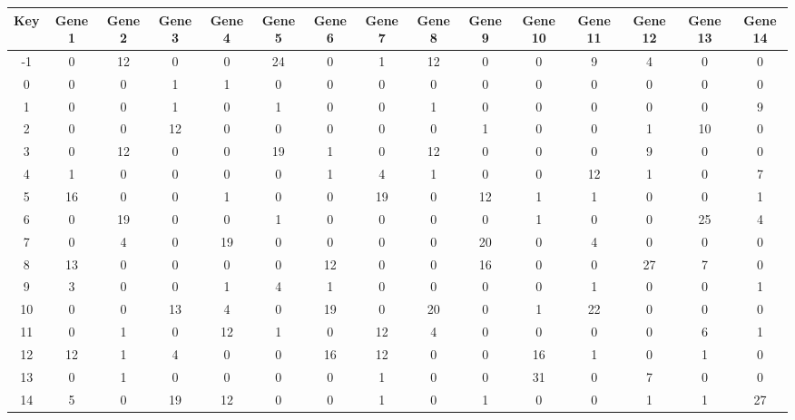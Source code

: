 \begin{tabular}{|c|c|c|c|c|c|c|c|c|c|c|c|c|c|c|}
\hline
Key & Gene 1 & Gene 2 & Gene 3 & Gene 4 & Gene 5 & Gene 6 & Gene 7 & Gene 8 & Gene 9 & Gene 10 & Gene 11 & Gene 12 & Gene 13 & Gene 14 \\
\hline
-1 & 0 & 12 & 0 & 0 & 24 & 0 & 1 & 12 & 0 & 0 & 9 & 4 & 0 & 0 \\
0 & 0 & 0 & 1 & 1 & 0 & 0 & 0 & 0 & 0 & 0 & 0 & 0 & 0 & 0 \\
1 & 0 & 0 & 1 & 0 & 1 & 0 & 0 & 1 & 0 & 0 & 0 & 0 & 0 & 9 \\
2 & 0 & 0 & 12 & 0 & 0 & 0 & 0 & 0 & 1 & 0 & 0 & 1 & 10 & 0 \\
3 & 0 & 12 & 0 & 0 & 19 & 1 & 0 & 12 & 0 & 0 & 0 & 9 & 0 & 0 \\
4 & 1 & 0 & 0 & 0 & 0 & 1 & 4 & 1 & 0 & 0 & 12 & 1 & 0 & 7 \\
5 & 16 & 0 & 0 & 1 & 0 & 0 & 19 & 0 & 12 & 1 & 1 & 0 & 0 & 1 \\
6 & 0 & 19 & 0 & 0 & 1 & 0 & 0 & 0 & 0 & 1 & 0 & 0 & 25 & 4 \\
7 & 0 & 4 & 0 & 19 & 0 & 0 & 0 & 0 & 20 & 0 & 4 & 0 & 0 & 0 \\
8 & 13 & 0 & 0 & 0 & 0 & 12 & 0 & 0 & 16 & 0 & 0 & 27 & 7 & 0 \\
9 & 3 & 0 & 0 & 1 & 4 & 1 & 0 & 0 & 0 & 0 & 1 & 0 & 0 & 1 \\
10 & 0 & 0 & 13 & 4 & 0 & 19 & 0 & 20 & 0 & 1 & 22 & 0 & 0 & 0 \\
11 & 0 & 1 & 0 & 12 & 1 & 0 & 12 & 4 & 0 & 0 & 0 & 0 & 6 & 1 \\
12 & 12 & 1 & 4 & 0 & 0 & 16 & 12 & 0 & 0 & 16 & 1 & 0 & 1 & 0 \\
13 & 0 & 1 & 0 & 0 & 0 & 0 & 1 & 0 & 0 & 31 & 0 & 7 & 0 & 0 \\
14 & 5 & 0 & 19 & 12 & 0 & 0 & 1 & 0 & 1 & 0 & 0 & 1 & 1 & 27 \\
\hline
\end{tabular}